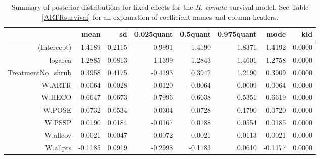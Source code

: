 \documentclass[11pt]{article}
\begin{document}
\begin{table}[ht]
\centering
\caption{Summary of posterior distributions for fixed effects for the \textit{H. comata} survival model. See Table \ref{ARTRsurvival} for an explanation of coefficient names
and column headers.} 
\label{HECOsurvival}
\begin{tabular}{rrrrrrrr}
  \hline
 & mean & sd & 0.025quant & 0.5quant & 0.975quant & mode & kld \\ 
  \hline
(Intercept) & 1.4189 & 0.2115 & 0.9991 & 1.4190 & 1.8371 & 1.4192 & 0.0000 \\ 
  logarea & 1.2885 & 0.0813 & 1.1399 & 1.2843 & 1.4601 & 1.2758 & 0.0000 \\ 
  TreatmentNo\_shrub & 0.3958 & 0.4175 & -0.4193 & 0.3942 & 1.2190 & 0.3909 & 0.0000 \\ 
  W.ARTR & -0.0064 & 0.0028 & -0.0120 & -0.0064 & -0.0009 & -0.0064 & 0.0000 \\ 
  W.HECO & -0.6647 & 0.0673 & -0.7996 & -0.6638 & -0.5351 & -0.6619 & 0.0000 \\ 
  W.POSE & 0.0732 & 0.0534 & -0.0304 & 0.0728 & 0.1790 & 0.0720 & 0.0000 \\ 
  W.PSSP & 0.0190 & 0.0184 & -0.0167 & 0.0188 & 0.0554 & 0.0185 & 0.0000 \\ 
  W.allcov & 0.0021 & 0.0047 & -0.0072 & 0.0021 & 0.0113 & 0.0021 & 0.0000 \\ 
  W.allpts & -0.1185 & 0.0919 & -0.2998 & -0.1183 & 0.0610 & -0.1177 & 0.0000 \\ 
   \hline
\end{tabular}
\end{table}
\end{document}
